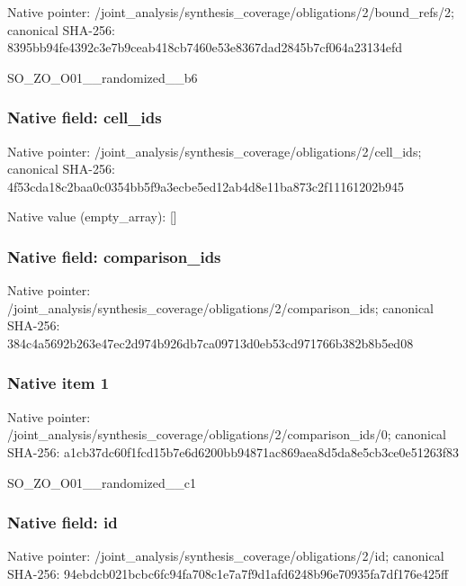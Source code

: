 \documentclass[10pt,a4paper]{article}
\begin{document}
Native pointer: /joint\_analysis/synthesi\allowbreak{}s\_coverage/obligations/2\allowbreak{}/bound\_refs/2; canonical SHA-256: 8395bb94fe4392c3e7b9ceab\allowbreak{}418cb7460e53e8367dad2845\allowbreak{}b7cf064a23134efd


SO\_ZO\_O01\_\_randomized\_\_b6


\subsubsection{Native field: cell\_ids}


Native pointer: /joint\_analysis/synthesi\allowbreak{}s\_coverage/obligations/2\allowbreak{}/cell\_ids; canonical SHA-256: 4f53cda18c2baa0c0354bb5f\allowbreak{}9a3ecbe5ed12ab4d8e11ba87\allowbreak{}3c2f11161202b945



Native value (empty\_array): []



\subsubsection{Native field: comparison\_ids}


Native pointer: /joint\_analysis/synthesi\allowbreak{}s\_coverage/obligations/2\allowbreak{}/comparison\_ids; canonical SHA-256: 384c4a5692b263e47ec2d974\allowbreak{}b926db7ca09713d0eb53cd97\allowbreak{}1766b382b8b5ed08



\subsubsection{Native item 1}


Native pointer: /joint\_analysis/synthesi\allowbreak{}s\_coverage/obligations/2\allowbreak{}/comparison\_ids/0; canonical SHA-256: a1cb37dc60f1fcd15b7e6d62\allowbreak{}00bb94871ac869aea8d5da8e\allowbreak{}5cb3ce0e51263f83


SO\_ZO\_O01\_\_randomized\_\_c1


\subsubsection{Native field: id}


Native pointer: /joint\_analysis/synthesi\allowbreak{}s\_coverage/obligations/2\allowbreak{}/id; canonical SHA-256: 94ebdcb021bcbc6fc94fa708\allowbreak{}c1e7a7f9d1afd6248b96e709\allowbreak{}35fa7df176e425ff
\end{document}
